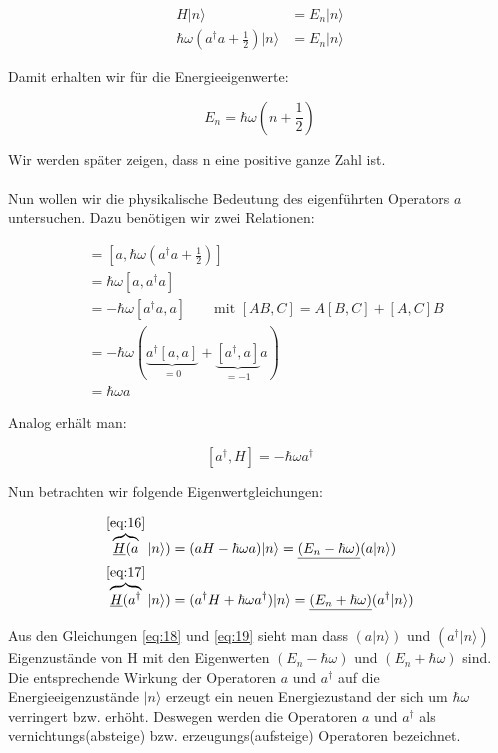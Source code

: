 \begin{align}
  \label{eq:14}
  H|n\rangle &=E_n|n\rangle\\
 \hbar\omega\left(a^\dagger a + \frac{1}{2}\right)|n\rangle &= E_n|n\rangle 
\end{align}

Damit erhalten wir für die Energieeigenwerte:

\begin{equation}
  \label{eq:15}
  \boxed{E_n = \hbar\omega\left(n + \frac{1}{2}\right) }
\end{equation}

Wir werden später zeigen, dass n eine positive ganze Zahl ist.\\
\\
Nun wollen wir die physikalische Bedeutung des eigenführten Operators \(a\) untersuchen. Dazu benötigen wir zwei Relationen:

\begin{align}
  [a,H] &= [a,\hbar\omega(a^\dagger a +\frac{1}{2})]  \\
&= \hbar\omega[a,a^\dagger a ]  \\
&=-\hbar\omega[a^\dagger a,a] \qquad \text{mit }[AB,C]=A[B,C]+[A,C]B \\
&=-\hbar\omega(\underbrace{a^\dagger[a,a]}_{=0}+\underbrace{[a^\dagger,a]}_{=-1}a)\\
&=\hbar\omega a \label{eq:16}
\end{align}

Analog erhält man:

\begin{equation}
  \label{eq:17}
  [a^\dagger,H] = -\hbar\omega a^\dagger
\end{equation}

Nun betrachten wir folgende Eigenwertgleichungen:

\begin{align}
 \overbrace{\underline{H}(a}^{\eqref{eq:16}}|n\rangle ) &= (aH-\hbar\omega a)|n\rangle  = \underline{(E_n-\hbar\omega)}(a|n\rangle ) \label{eq:18}\\
  \overbrace{\underline{H}(a^\dagger}^{\eqref{eq:17}}|n\rangle ) &= (a^\dagger H+\hbar\omega a^\dagger)|n\rangle  = \underline{(E_n+\hbar\omega)}(a^\dagger|n\rangle )\label{eq:19}
\end{align}



Aus den Gleichungen \eqref{eq:18} und \eqref{eq:19} sieht man dass \((a|n\rangle) \) und \((a^\dagger|n\rangle)\) Eigenzustände von H mit den Eigenwerten \((E_n-\hbar\omega)\) und  \((E_n+ \hbar\omega)\) sind. Die entsprechende Wirkung der Operatoren \(a\) und \(a^\dagger\) auf die Energieeigenzustände \(|n\rangle \) erzeugt ein neuen Energiezustand der sich um \(\hbar\omega\) verringert bzw. erhöht. Deswegen werden die Operatoren \(a\) und \(a^\dagger\) als vernichtungs(absteige) bzw. erzeugungs(aufsteige) Operatoren bezeichnet. 

